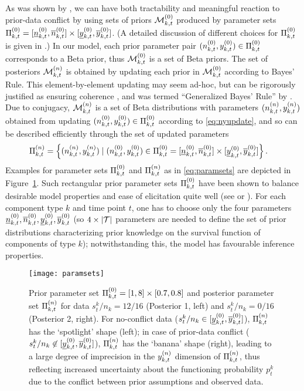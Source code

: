 \documentclass[12pt, a4paper]{elsarticle}
\begin{document}
As was shown by \citet{2009:WalterAugustin}, %
we can have both tractability and meaningful reaction to prior-data conflict
by using sets of priors $\mathcal{M}^{(0)}_{k,t}$ produced by parameter sets $\Pi^{(0)}_{k,t} = [\underline{n}^{(0)}_{k,t}, \overline{n}^{(0)}_{k,t}] \times [\underline{y}^{(0)}_{k,t}, \overline{y}^{(0)}_{k,t}]$. 
(A detailed discussion of different choices for $\Pi^{(0)}_{k,t}$ is given in \citet[\S 3.1]{2013:diss-gw}.)
In our model, each prior parameter pair $(n^{(0)}_{k,t}, y^{(0)}_{k,t}) \in \Pi^{(0)}_{k,t}$
corresponds to a Beta prior, thus $\mathcal{M}^{(0)}_{k,t}$ is a set of Beta priors.
The set of posteriors $\mathcal{M}^{(n)}_{k,t}$ is obtained by updating each prior in $\mathcal{M}^{(0)}_{k,t}$ according to Bayes' Rule.
This element-by-element updating may seem ad-hoc, but can be rigorously justified
as ensuring coherence \citep[\S 2.5]{1991:walley}, and was termed ``Generalized Bayes' Rule'' by \citet[\S 6.4]{1991:walley}.
Due to conjugacy, $\mathcal{M}^{(n)}_{k,t}$ is a set of Beta distributions with parameters $(n^{(n)}_{k,t}, y^{(n)}_{k,t})$
obtained from updating $(n^{(0)}_{k,t}, y^{(0)}_{k,t}) \in \Pi^{(0)}_{k,t}$ according to \eqref{eq:nyupdate},
and so can be described efficiently through the set of updated parameters
\begin{align}
\Pi^{(n)}_{k,t} &= \Big\{ (n^{(n)}_{k,t}, y^{(n)}_{k,t}) \mid (n^{(0)}_{k,t}, y^{(0)}_{k,t}) \in \Pi^{(0)}_{k,t} = [\underline{n}^{(0)}_{k,t}, \overline{n}^{(0)}_{k,t}] \times [\underline{y}^{(0)}_{k,t}, \overline{y}^{(0)}_{k,t}] \Big\}\,.
\label{eq:paramsets}
\end{align}
Examples for parameter sets $\Pi^{(0)}_{k,t}$ and $\Pi^{(n)}_{k,t}$ as in \eqref{eq:paramsets} are depicted in Figure~\ref{fig:paramsets}.
Such rectangular prior parameter sets $\Pi^{(0)}_{k,t}$ have been shown
to balance desirable model properties and ease of elicitation quite well
(see \citet[pp.~123f]{2013:diss-gw} or \citet{Troffaes2013a-short}).
%
For each component type $k$ and time point $t$,
one has to choose only the four parameters $\underline{n}^{(0)}_{k,t}, \overline{n}^{(0)}_{k,t}, \underline{y}^{(0)}_{k,t}, \overline{y}^{(0)}_{k,t}$
(so $4 \times |{\cal T}|$ parameters are needed to define the set of prior distributions characterizing
prior knowledge on the survival function of components of type $k$);
notwithstanding this, the model has favourable inference properties.

\begin{figure}
\texttt{[image: paramsets]}
\caption{Prior parameter set $\Pi^{(0)}_{k,t} = [1,8] \times [0.7,0.8]$ and posterior parameter set $\Pi^{(n)}_{k,t}$
for data $s^k_t/n_k = 12/16$ (Posterior 1, left) and $s^k_t/n_k = 0/16$ (Posterior 2, right).
For no-conflict data ($s^k_t/n_k \in [\underline{y}^{(0)}_{k,t},\overline{y}^{(0)}_{k,t}]$), $\Pi^{(n)}_{k,t}$ has the `spotlight' shape (left);
in case of prior-data conflict ($s^k_t/n_k \not\in [\underline{y}^{(0)}_{k,t},\overline{y}^{(0)}_{k,t}]$), $\Pi^{(n)}_{k,t}$ has the `banana' shape (right),
leading to a large degree of imprecision in the $y^{(n)}_{k,t}$ dimension of $\Pi^{(n)}_{k,t}$,
thus reflecting increased uncertainty about the functioning probability $p^k_t$
due to the conflict between prior assumptions and observed data.}
\label{fig:paramsets}
\end{figure}
\end{document}
